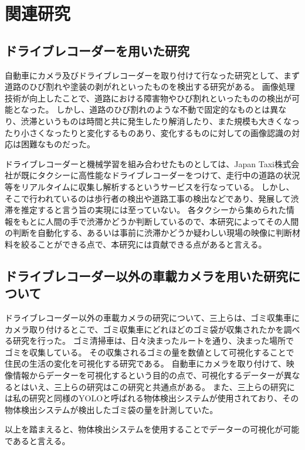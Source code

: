 \chapter{関連研究}
\section{ドライブレコーダーを用いた研究}
自動車にカメラ及びドライブレコーダーを取り付けて行なった研究として、まず道路のひび割れや塗装の剥がれといったものを検出する研究\cite{全邦釘2017ディープラーニングおよび}がある。
画像処理技術が向上したことで、道路における障害物やひび割れといったものの検出が可能となった。
しかし、道路のひび割れのような不動で固定的なものとは異なり、渋滞というものは時間と共に発生したり解消したり、また規模も大きくなったり小さくなったりと変化するものあり、変化するものに対しての画像認識の対応は困難なものだった。

ドライブレコーダーと機械学習を組み合わせたものとしては、Japan Taxi株式会社が既にタクシーに高性能なドライブレコーダーをつけて、走行中の道路の状況等をリアルタイムに収集し解析するというサービスを行なっている。
しかし、そこで行われているのは歩行者の検出や道路工事の検出などであり、発展して渋滞を推定すると言う旨の実現には至っていない。
各タクシーから集められた情報をもとに人間の手で渋滞かどうか判断しているので、本研究によってその人間の判断を自動化する、あるいは事前に渋滞かどうか疑わしい現場の映像に判断材料を絞ることができる点で、本研究には貢献できる点があると言える。

\section{ドライブレコーダー以外の車載カメラを用いた研究について}
ドライブレコーダー以外の車載カメラの研究について、三上ら\cite{三上量弘2020deepcounter}は、ゴミ収集車にカメラ取り付けるとこで、ゴミ収集車にどれほどのゴミ袋が収集されたかを調べる研究を行った。
ゴミ清掃車は、日々決まったルートを通り、決まった場所でゴミを収集している。
その収集されるゴミの量を数値として可視化することで住民の生活の変化を可視化する研究である。
自動車にカメラを取り付けて、映像情報からデーターを可視化するという目的の点で、可視化するデーターが異なるとはいえ、三上らの研究はこの研究と共通点がある。
また、三上らの研究には私の研究と同様のYOLOと呼ばれる物体検出システムが使用されており、その物体検出システムが検出したゴミ袋の量を計測していた。

以上を踏まえると、物体検出システムを使用することでデーターの可視化が可能であると言える。


